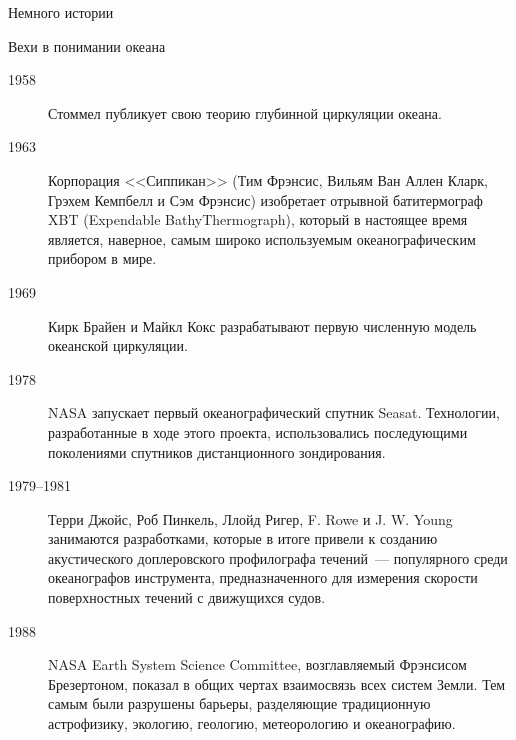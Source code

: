 \begin{chapter}{Немного истории}
\begin{section}{Вехи в понимании океана}
\begin{description}
\item[1958] Стоммел публикует свою теорию глубинной циркуляции океана.
%

\item[1963] Корпорация <<Сиппикан>> (Тим Фрэнсис,
Вильям Ван Аллен Кларк, Грэхем Кемпбелл и Сэм Фрэнсис) изобретает
отрывной батитермограф XBT (Expendable BathyThermograph), который 
в настоящее время является, наверное, самым широко используемым 
океанографическим прибором в мире.
%

\item[1969] Кирк Брайен и Майкл Кокс разрабатывают первую численную
модель океанской циркуляции.
%

\item[1978] NASA запускает первый океанографический спутник Seasat. 
Технологии, разработанные в ходе этого проекта, использовались последующими
поколениями спутников дистанционного зондирования.
%

\item[1979--1981] Терри Джойс, Роб Пинкель, Ллойд Ригер, F. Rowe и
J. W. Young занимаются разработками, которые в итоге привели к созданию
акустического доплеровского профилографа течений~--- популярного среди
океанографов инструмента, предназначенного для измерения скорости 
поверхностных течений с движущихся судов.
%

\item[1988] NASA Earth System Science Committee, возглавляемый
Фрэнсисом Брезертоном, показал в общих чертах взаимосвязь всех систем Земли.
Тем самым были разрушены барьеры, разделяющие традиционную астрофизику, 
экологию, геологию, метеорологию и океанографию.
%


\end{description}
\end{section}
\end{chapter}
